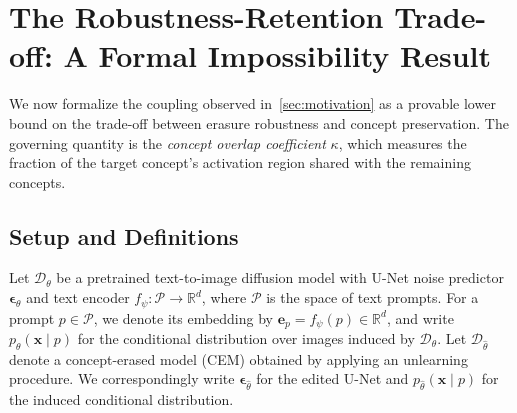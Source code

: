\section{The Robustness-Retention Trade-off: A Formal Impossibility Result}
\label{sec:tradeoff}

We now formalize the coupling observed in~\cref{sec:motivation} as a provable lower bound on the trade-off between erasure robustness and concept preservation. The governing quantity is the \emph{concept overlap coefficient} $\kappa$, which measures the fraction of the target concept's activation region shared with the remaining concepts.

\subsection{Setup and Definitions}
\label{subsec:definitions}

Let $\mathcal{D}_\theta$ be a pretrained text-to-image diffusion model with U{-}Net noise predictor $\boldsymbol{\epsilon}_\theta$ and text encoder $f_\psi : \mathcal{P} \to \mathbb{R}^d$, where $\mathcal{P}$ is the space of text prompts. 
For a prompt $p \in \mathcal{P}$, we denote its embedding by $\mathbf{e}_p = f_\psi(p) \in \mathbb{R}^d$, and write $p_\theta(\mathbf{x} \mid p)$ for the conditional distribution over images induced by $\mathcal{D}_\theta$.
Let $\mathcal{D}_{\hat\theta}$ denote a concept-erased model (CEM) obtained by applying an unlearning procedure. 
We correspondingly write $\boldsymbol{\epsilon}_{\hat\theta}$ for the edited U-Net and $p_{\hat\theta}(\mathbf{x} \mid p)$ for the induced conditional distribution. 


